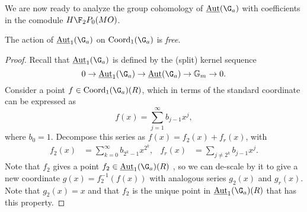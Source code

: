We are now ready to analyze the group cohomology of $\InternalAut(\G_a)$ with coefficients in the comodule $H\F_2P_0(MO)$.
\begin{theorem}
The action of $\InternalAut_1(\G_a)$ on $\Coord_1(\G_a)$ is \emph{free}.
\end{theorem}
\begin{proof}
Recall that $\InternalAut_1(\G_a)$ is defined by the (split) kernel sequence \[0 \to \InternalAut_1(\G_a) \to \InternalAut(\G_a) \to \Gm \to 0.\]  Consider a point $f \in \Coord_1(\G_a)(R)$, which in terms of the standard coordinate can be expressed as \[f(x) = \sum_{j=1}^\infty b_{j-1} x^j,\]  where $b_0 = 1$.  Decompose this series as $f(x) = f_2(x) + f_r(x)$, with
\begin{align*}
f_2(x) & = \sum_{k=0}^\infty b_{2^k-1} x^{2^k}, &
f_r(x) & = \sum_{j \ne 2^k} b_{j-1} x^j.
\end{align*}
Note that $f_2$ gives a point $f_2 \in \InternalAut_1(\G_a)(R)$ , so we can de-scale by it to give a new coordinate $g(x) = f_2^{-1}(f(x))$ with analogous series $g_2(x)$ and $g_r(x)$.  Note that $g_2(x) = x$ and that $f_2$ is the unique point in $\InternalAut_1(\G_a)(R)$ that has this property.
\end{proof}

